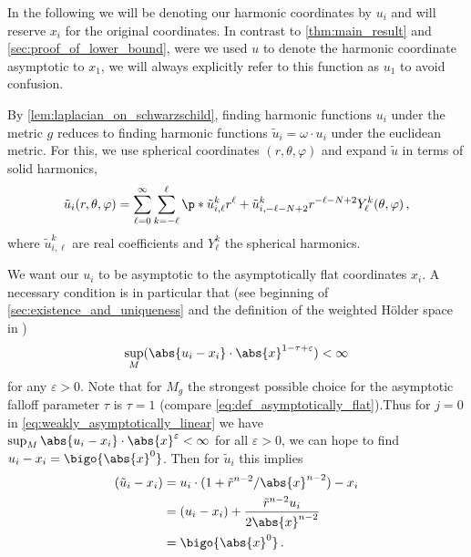 \documentclass[titlepage,numbers=noenddot,oneside,%
cleardoublepage=empty,paper=a4,fontsize=11pt,%
english,%
]{scrartcl}
\newcommand*{\mathcomma}{\,,}
\newcommand*{\mathfullstop}{\,.}
\begin{document}
\begin{remark}
    In the following we will be denoting our harmonic coordinates by \( u_i \) and will reserve \( x_i \) for the original coordinates. In contrast to \cref{thm:main_result} and \cref{sec:proof_of_lower_bound}, were we used \( u \) to denote the harmonic coordinate asymptotic to \( x_1 \), we will always explicitly refer to this function as \( u_1 \) to avoid confusion.
\end{remark}
By \cref{lem:laplacian_on_schwarzschild}, finding harmonic functions \( u_i \) under the metric \( g \) reduces to finding harmonic functions \( \tilde{u}_i=\omega \cdot u_i \) under the euclidean metric. For this, we use spherical coordinates \( (r,\theta,\varphi) \) and expand \( \tilde{u} \) in terms of solid harmonics,
\begin{equation*}
    \tilde{u}_i(r,\theta,\varphi)=\sum_{\ell=0}^\infty \sum_{k=-\ell}^\ell \p*{\tilde{u}^k_{i,\ell} r^\ell + \tilde{u}^k_{i,-\ell-N+2} r^{-\ell-N+2}}Y^k_{\ell}(\theta,\varphi)\mathcomma
\end{equation*}
where \( \tilde{u}^k_{i,\ell} \) are real coefficients and \( Y^k_{\ell} \) the spherical harmonics.

We want our \( u_i \) to be asymptotic to the asymptotically flat coordinates \( x_i \). A necessary condition is in particular that (see beginning of \cref{sec:existence_and_uniqueness} and the definition of the weighted Hölder space in \cite[Section 3]{almarazPositiveMassTheorem2016})
\begin{equation}\label{eq:weakly_asymptotically_linear}
    \sup_M (\abs{u_i-x_i} \cdot\abs{x}^{1-\tau+\varepsilon})<\infty
\end{equation}
for any \( \varepsilon>0 \). Note that for \( M_g \) the strongest possible choice for the asymptotic falloff parameter \( \tau \) is \( \tau=1 \) (compare \cref{eq:def_asymptotically_flat}).Thus for \( j=0 \) in \cref{eq:weakly_asymptotically_linear} we have \( \sup_M \abs{u_i-x_i}\cdot \abs{x}^\varepsilon<\infty \) for all \( \varepsilon>0 \), \ie we can hope to find \( u_i-x_i=\bigo{\abs{x}^0} \). Then for \( \tilde{u}_i \) this implies
\begin{equation*}
    \begin{aligned}[t]
        (\tilde{u}_i-x_i)&=u_i\cdot (1+\tilde{r}^{n-2}/\abs{x}^{n-2})-x_i\\
        &=(u_i-x_i)+\frac{\tilde{r}^{n-2} u_i}{2\abs{x}^{n-2}}\\
        &=\bigo{\abs{x}^0}\mathfullstop
    \end{aligned}
\end{equation*}
\end{document}
